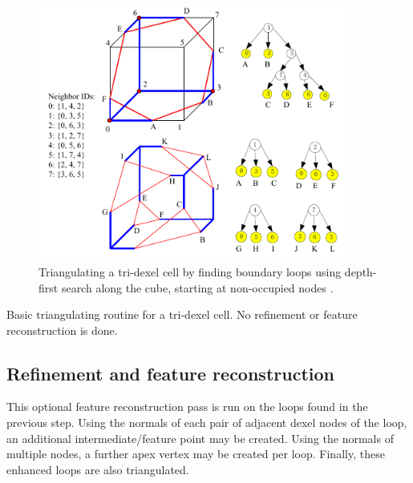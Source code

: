 \begin{figure}
	\centering
	\includegraphics[width=0.9\textwidth]{images/tri_dexel_triangulation}
	\caption{
		Triangulating a tri-dexel cell by finding boundary loops using depth-first search along the cube, starting at non-occupied nodes \cite{tridexel_reconstruction}.
	}
	\label{fig:tri_dexel_triangulation}
\end{figure}

\begin{algorithm}
	\centering
	\begin{algorithmic}[1]
		
		\EndFunction
	\end{algorithmic}
	\caption{
		Basic triangulating routine for a tri-dexel cell.
		No refinement or feature reconstruction is done.
	}
	\label{alg:tri_dexel_triangulation}
\end{algorithm}

\subsection{Refinement and feature reconstruction}
\label{sec:tri_dexel_refinement}

This optional feature reconstruction pass is run on the loops found in the previous step.
Using the normals of each pair of adjacent dexel nodes of the loop, an additional intermediate/feature point may be created.
Using the normals of multiple nodes, a further apex vertex may be created per loop.
Finally, these enhanced loops are also triangulated.

